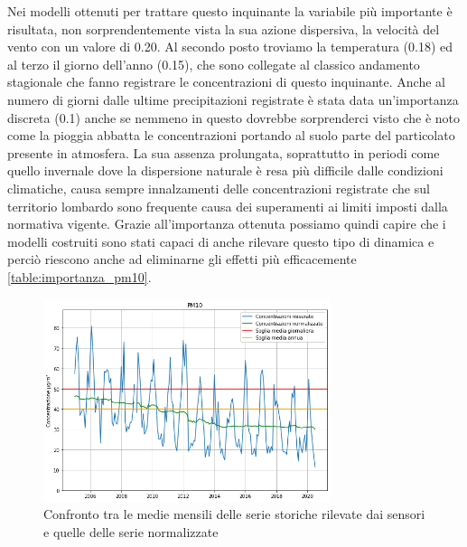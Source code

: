 \documentclass[a4paper]{report}
\begin{document}
Nei modelli ottenuti per trattare questo inquinante la variabile più importante è risultata, non sorprendentemente vista la sua azione dispersiva, la velocità del vento con un valore di 0.20. Al secondo posto troviamo la temperatura (0.18) ed al terzo il giorno dell'anno (0.15), che sono collegate al classico andamento stagionale che fanno registrare le concentrazioni di questo inquinante. Anche al numero di giorni dalle ultime precipitazioni registrate è stata data un'importanza discreta (0.1) anche se nemmeno in questo dovrebbe sorprenderci visto che è noto come la pioggia abbatta le concentrazioni portando al suolo parte del particolato presente in atmosfera. La sua assenza prolungata, soprattutto in periodi come quello invernale dove la dispersione naturale è resa più difficile dalle condizioni climatiche, causa sempre innalzamenti delle concentrazioni registrate che sul territorio lombardo sono frequente causa dei superamenti ai limiti imposti dalla normativa vigente. Grazie all'importanza ottenuta possiamo quindi capire che i modelli costruiti sono stati capaci di anche rilevare questo tipo di dinamica e perciò riescono anche ad eliminarne gli effetti più efficacemente \ref{table:importanza_pm10}.

\begin{figure}[h]
\centering
\includegraphics[width=0.75\textwidth]{pm10_medie_mensili}
\caption{Confronto tra le medie mensili delle serie storiche rilevate dai sensori e quelle delle serie normalizzate}
\label{fig:pm10_medie_mensili}
\end{figure}

\end{document}
